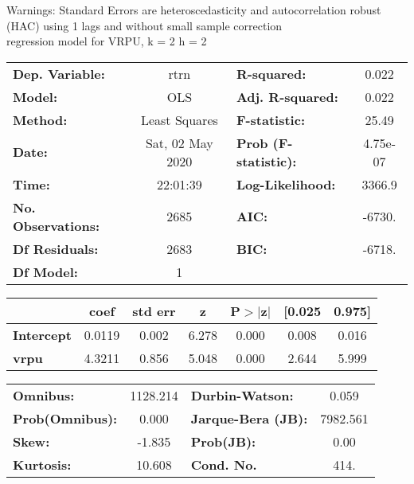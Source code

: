 Warnings: \newline
 [1] Standard Errors are heteroscedasticity and autocorrelation robust (HAC) using 1 lags and without small sample correction\\ 

regression model for VRPU, k = 2 h = 2\begin{center}
\begin{tabular}{lclc}
\toprule
\textbf{Dep. Variable:}    &       rtrn       & \textbf{  R-squared:         } &     0.022   \\
\textbf{Model:}            &       OLS        & \textbf{  Adj. R-squared:    } &     0.022   \\
\textbf{Method:}           &  Least Squares   & \textbf{  F-statistic:       } &     25.49   \\
\textbf{Date:}             & Sat, 02 May 2020 & \textbf{  Prob (F-statistic):} &  4.75e-07   \\
\textbf{Time:}             &     22:01:39     & \textbf{  Log-Likelihood:    } &    3366.9   \\
\textbf{No. Observations:} &        2685      & \textbf{  AIC:               } &    -6730.   \\
\textbf{Df Residuals:}     &        2683      & \textbf{  BIC:               } &    -6718.   \\
\textbf{Df Model:}         &           1      & \textbf{                     } &             \\
\bottomrule
\end{tabular}
\begin{tabular}{lcccccc}
                   & \textbf{coef} & \textbf{std err} & \textbf{z} & \textbf{P$> |$z$|$} & \textbf{[0.025} & \textbf{0.975]}  \\
\midrule
\textbf{Intercept} &       0.0119  &        0.002     &     6.278  &         0.000        &        0.008    &        0.016     \\
\textbf{vrpu}      &       4.3211  &        0.856     &     5.048  &         0.000        &        2.644    &        5.999     \\
\bottomrule
\end{tabular}
\begin{tabular}{lclc}
\textbf{Omnibus:}       & 1128.214 & \textbf{  Durbin-Watson:     } &    0.059  \\
\textbf{Prob(Omnibus):} &   0.000  & \textbf{  Jarque-Bera (JB):  } & 7982.561  \\
\textbf{Skew:}          &  -1.835  & \textbf{  Prob(JB):          } &     0.00  \\
\textbf{Kurtosis:}      &  10.608  & \textbf{  Cond. No.          } &     414.  \\
\bottomrule
\end{tabular}
\end{center}

